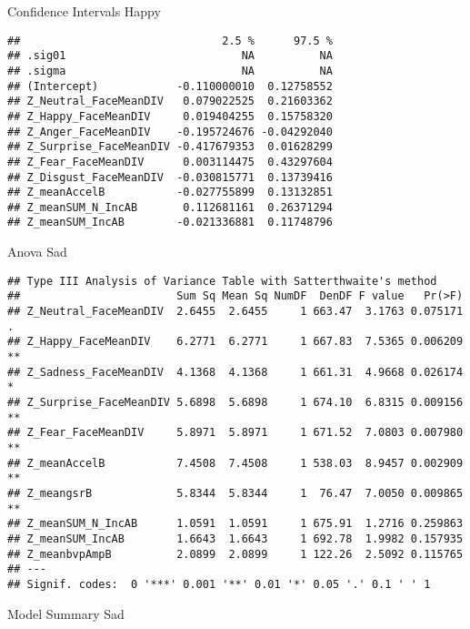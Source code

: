 \documentclass[
]{article}
\begin{document}
Confidence Intervals Happy

\begin{verbatim}
##                               2.5 %      97.5 %
## .sig01                           NA          NA
## .sigma                           NA          NA
## (Intercept)            -0.110000010  0.12758552
## Z_Neutral_FaceMeanDIV   0.079022525  0.21603362
## Z_Happy_FaceMeanDIV     0.019404255  0.15758320
## Z_Anger_FaceMeanDIV    -0.195724676 -0.04292040
## Z_Surprise_FaceMeanDIV -0.417679353  0.01628299
## Z_Fear_FaceMeanDIV      0.003114475  0.43297604
## Z_Disgust_FaceMeanDIV  -0.030815771  0.13739416
## Z_meanAccelB           -0.027755899  0.13132851
## Z_meanSUM_N_IncAB       0.112681161  0.26371294
## Z_meanSUM_IncAB        -0.021336881  0.11748796
\end{verbatim}

Anova Sad

\begin{verbatim}
## Type III Analysis of Variance Table with Satterthwaite's method
##                        Sum Sq Mean Sq NumDF  DenDF F value   Pr(>F)   
## Z_Neutral_FaceMeanDIV  2.6455  2.6455     1 663.47  3.1763 0.075171 . 
## Z_Happy_FaceMeanDIV    6.2771  6.2771     1 667.83  7.5365 0.006209 **
## Z_Sadness_FaceMeanDIV  4.1368  4.1368     1 661.31  4.9668 0.026174 * 
## Z_Surprise_FaceMeanDIV 5.6898  5.6898     1 674.10  6.8315 0.009156 **
## Z_Fear_FaceMeanDIV     5.8971  5.8971     1 671.52  7.0803 0.007980 **
## Z_meanAccelB           7.4508  7.4508     1 538.03  8.9457 0.002909 **
## Z_meangsrB             5.8344  5.8344     1  76.47  7.0050 0.009865 **
## Z_meanSUM_N_IncAB      1.0591  1.0591     1 675.91  1.2716 0.259863   
## Z_meanSUM_IncAB        1.6643  1.6643     1 692.78  1.9982 0.157935   
## Z_meanbvpAmpB          2.0899  2.0899     1 122.26  2.5092 0.115765   
## ---
## Signif. codes:  0 '***' 0.001 '**' 0.01 '*' 0.05 '.' 0.1 ' ' 1
\end{verbatim}

Model Summary Sad
\end{document}
